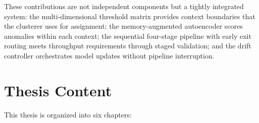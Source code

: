 These contributions are not independent components but a tightly integrated system: the multi-dimensional threshold matrix provides context boundaries that the clusterer uses for assignment; the memory-augmented autoencoder scores anomalies within each context; the sequential four-stage pipeline with early exit routing meets throughput requirements through staged validation; and the drift controller orchestrates model updates without pipeline interruption.

\section{Thesis Content}

This thesis is organized into six chapters:

